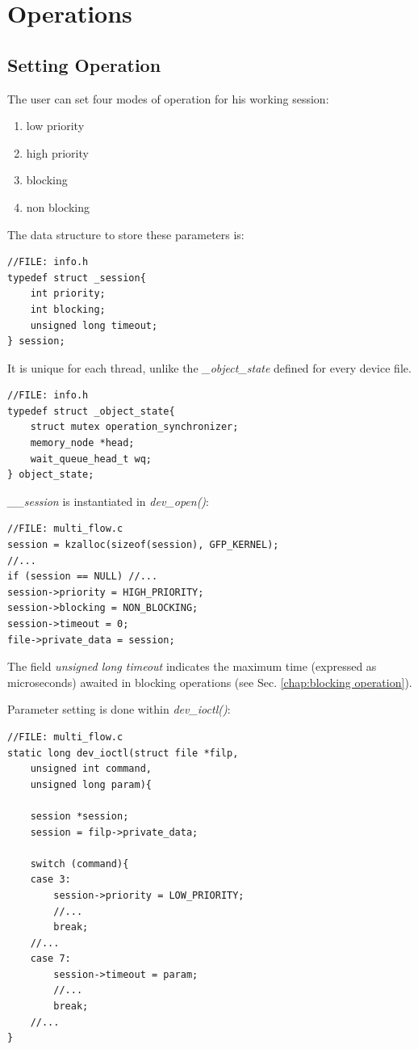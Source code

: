 \documentclass[12pt]{report}
\begin{document}
\chapter{Operations}
\section{Setting Operation}

The user can set four modes of operation for his working session: 

\begin{enumerate}
	\itemsep0em 
	\item low priority
	\item high priority
	\item blocking
	\item non blocking
\end{enumerate}

The data structure to store these parameters is:

\begin{lstlisting}
//FILE: info.h
typedef struct _session{
	int priority;       
	int blocking;
	unsigned long timeout;
} session;
\end{lstlisting}

It is unique for each thread, unlike the \emph{\_object\_state} defined for every device file.

\begin{lstlisting}
//FILE: info.h
typedef struct _object_state{
	struct mutex operation_synchronizer;
	memory_node *head;
	wait_queue_head_t wq;
} object_state;
\end{lstlisting}

\emph{\_\_session} is instantiated in \emph{dev\_open()}:

\begin{lstlisting}
//FILE: multi_flow.c
session = kzalloc(sizeof(session), GFP_KERNEL);
//...
if (session == NULL) //...
session->priority = HIGH_PRIORITY;
session->blocking = NON_BLOCKING;
session->timeout = 0;
file->private_data = session;
\end{lstlisting}

The field \emph{unsigned long timeout} indicates the maximum time (expressed as microseconds) awaited in blocking operations (see Sec. \ref{chap:blocking operation}). 

Parameter setting is done within \emph{dev\_ioctl()}:

\begin{lstlisting}
//FILE: multi_flow.c
static long dev_ioctl(struct file *filp, 
	unsigned int command, 
	unsigned long param){

	session *session;
	session = filp->private_data;
	
	switch (command){
	case 3:
		session->priority = LOW_PRIORITY;
		//...
		break;
	//...
	case 7:
		session->timeout = param;
		//...
		break;
	//...
}
\end{lstlisting}
\end{document}

